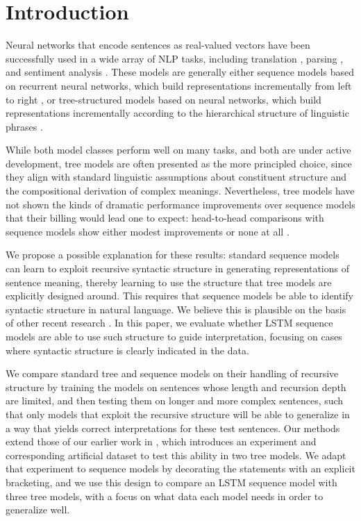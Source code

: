 \section{Introduction}\label{sec:intro}

Neural networks that encode sentences as real-valued vectors have been successfully used in a wide array of NLP tasks, including translation \cite{sutskever2014sequence}, parsing \cite{dyer2015transition}, and sentiment analysis \cite{tai2015improved}. 
These models are generally either 
sequence models based on recurrent neural networks, which build representations incrementally from left to right \cite{elman1990finding,sutskever2014sequence}, or tree-structured models based on  neural networks, which build representations incrementally 
according to the hierarchical structure of linguistic phrases \cite{goller1996learning,socher2011semi}. 

While both model classes perform
well on many tasks, and both are under active development,
tree models are often presented as the more principled choice, since they align with standard linguistic assumptions about constituent structure and the compositional derivation of complex meanings.
Nevertheless,
tree models have not shown the kinds of dramatic performance improvements over sequence models that their billing would lead one to expect: head-to-head comparisons with sequence models show either modest improvements \cite{tai2015improved} or none at all \cite{li2015tree}. 

We propose a possible explanation for these results: standard sequence models can learn to
exploit recursive syntactic structure in generating representations of sentence meaning, thereby 
learning to use the 
structure that tree models are explicitly designed around. This requires that
sequence models be able to identify syntactic structure in natural language. We believe this is plausible on the basis of other recent research \cite{vinyals2014grammar,Karpathy2015vaurn}.
In this paper, we  evaluate whether LSTM sequence models are able to use such structure to guide interpretation, 
focusing on cases where syntactic structure is clearly indicated in the data.

We compare standard tree and sequence models on their handling of recursive structure by training the models on sentences whose length and recursion depth are limited, and then testing them on longer and more complex sentences, such that only models that exploit the recursive structure will be able to generalize in a way that yields correct interpretations for these test sentences. Our methods extend those of our earlier work in \cite{Bowman:Potts:Manning:2014}, which introduces an experiment and corresponding artificial dataset to test this ability in two tree models. We adapt that experiment to sequence models by decorating the statements with an explicit bracketing, and we use this design to compare an LSTM sequence model with three tree models, with a focus on what data each model needs in order to generalize well. 

